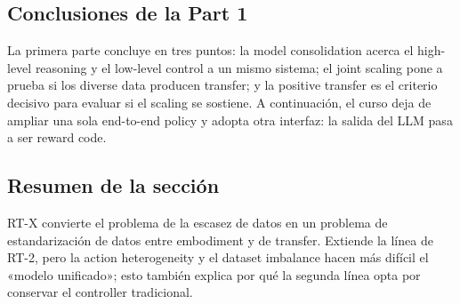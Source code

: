 
\subsection{Conclusiones de la Part 1}

La primera parte concluye en tres puntos: la model consolidation acerca el high-level reasoning y el low-level control a un mismo sistema; el joint scaling pone a prueba si los diverse data producen transfer; y la positive transfer es el criterio decisivo para evaluar si el scaling se sostiene. A continuación, el curso deja de ampliar una sola end-to-end policy y adopta otra interfaz: la salida del LLM pasa a ser reward code.


\subsection{Resumen de la sección}

RT-X convierte el problema de la escasez de datos en un problema de estandarización de datos entre embodiment y de transfer. Extiende la línea de RT-2, pero la action heterogeneity y el dataset imbalance hacen más difícil el «modelo unificado»; esto también explica por qué la segunda línea opta por conservar el controller tradicional.
